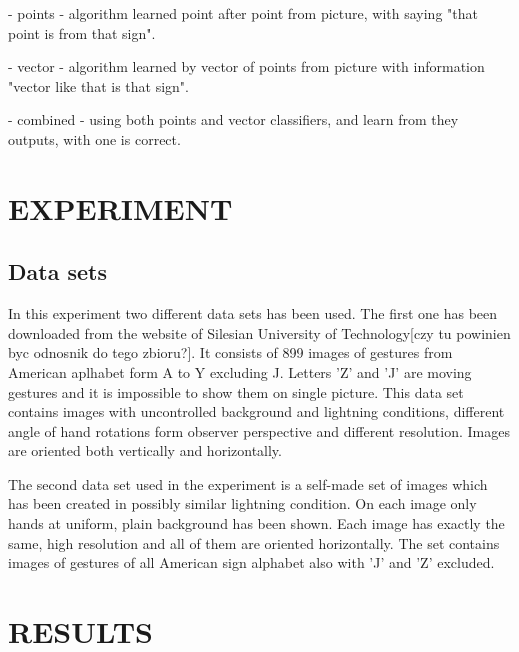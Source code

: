 \documentclass[11pt,a4paper]{article}
\begin{document}
- points - algorithm learned point after point from picture, with saying "that point is from that sign".

- vector - algorithm learned by vector of points from picture with information "vector like that is that sign".

- combined - using both points and vector classifiers, and learn from they outputs, with one is correct.  


\section{EXPERIMENT}

\subsection{Data sets}
	In this experiment two different data sets has been used. The first one has been downloaded from the website of Silesian University of Technology[czy tu powinien byc odnosnik do tego zbioru?]. It consists of 899 images of gestures from American aplhabet form A to Y excluding J. Letters 'Z' and 'J' are moving gestures and it is impossible to show them on single picture. This data set contains images with uncontrolled background and lightning conditions, different angle of hand rotations form observer perspective and different resolution. Images are oriented both vertically and horizontally.
	
	The second data set used in the experiment is a self-made set of images which has been created in possibly similar lightning condition. On each image only hands at uniform, plain background has been shown. Each image has exactly the same, high resolution and all of them are oriented horizontally. The set contains images of gestures of all American sign alphabet also with 'J' and 'Z' excluded.



\section{RESULTS}
\end{document}
